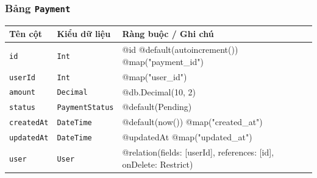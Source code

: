 \subsubsection{Bảng \texttt{Payment}}
\begin{longtable}{|p{3.6cm}|p{3.0cm}|p{8.9cm}|}
\hline
\rowcolor{headerblue} \textbf{Tên cột} & \textbf{Kiểu dữ liệu} & \textbf{Ràng buộc / Ghi chú} \\ \hline
\endhead
\texttt{id} & \texttt{Int} & \small @id @default(autoincrement()) @map("payment\_id") \\ \hline
\texttt{userId} & \texttt{Int} & \small @map("user\_id") \\ \hline
\texttt{amount} & \texttt{Decimal} & \small @db.Decimal(10, 2) \\ \hline
\texttt{status} & \texttt{PaymentStatus} & \small @default(Pending) \\ \hline
\texttt{createdAt} & \texttt{DateTime} & \small @default(now()) @map("created\_at") \\ \hline
\texttt{updatedAt} & \texttt{DateTime} & \small @updatedAt @map("updated\_at") \\ \hline
\texttt{user} & \texttt{User} & \small @relation(fields: [userId], references: [id], onDelete: Restrict) \\ \hline
\end{longtable}

